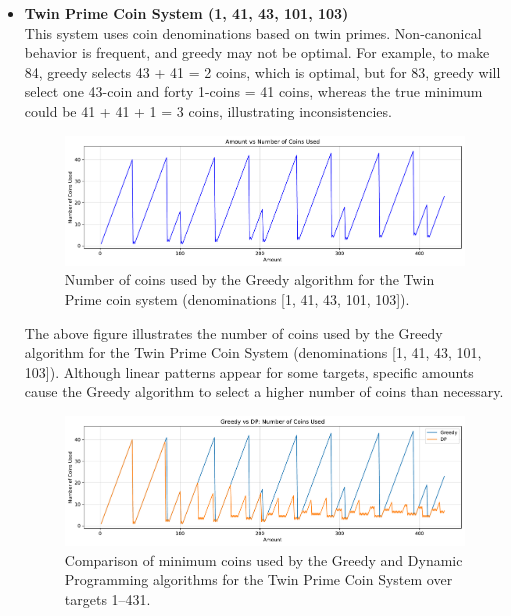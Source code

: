 \documentclass[12pt,a4paper]{report}
\begin{document}
\begin{itemize}
    \item \textbf{Twin Prime Coin System (1, 41, 43, 101, 103)}\\
    This system uses coin denominations based on twin primes. Non-canonical behavior is frequent, and greedy may not be optimal. For example, to make 84, greedy selects 43 + 41 = 2 coins, which is optimal, but for 83, greedy will select one 43-coin and forty 1-coins = 41 coins, whereas the true minimum could be 41 + 41 + 1 = 3 coins, illustrating inconsistencies.  
    \begin{figure}[H]
      \centering
      \includegraphics[width=\textwidth]{graphs/greedy_coins_twin_prime_plot.pdf}
      \caption{Number of coins used by the Greedy algorithm for the Twin Prime coin system (denominations [1, 41, 43, 101, 103]).}
      \label{fig:greedy_coins_twin_prime_plot}
    \end{figure}

    The above figure illustrates the number of coins used by the Greedy algorithm for the Twin Prime Coin System (denominations [1, 41, 43, 101, 103]). Although linear patterns appear for some targets, specific amounts cause the Greedy algorithm to select a higher number of coins than necessary.

    \begin{figure}[H]
      \centering
      \includegraphics[width=\textwidth]{graphs/compare_coins_twin_prime_plot.pdf}
      \caption{Comparison of minimum coins used by the Greedy and Dynamic Programming algorithms for the Twin Prime Coin System over targets 1--431.}
      \label{fig:compare_coins_twin_prime_plot}
    \end{figure}


\end{itemize}
\end{document}

